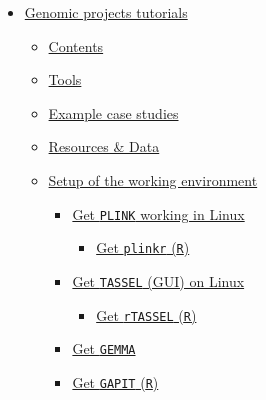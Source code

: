 \begin{itemize}
  \tightlist
  \item
        \protect\hyperlink{genomic-projects-tutorials}{Genomic projects
          tutorials}

        \begin{itemize}
          \tightlist
          \item
                \protect\hyperlink{contents}{Contents}
          \item
                \protect\hyperlink{tools}{Tools}
          \item
                \protect\hyperlink{example-case-studies}{Example case studies}
          \item
                \protect\hyperlink{resources--data}{Resources \& Data}
          \item
                \protect\hyperlink{setup-of-the-working-environment}{Setup of the
                  working environment}

                \begin{itemize}
                  \tightlist
                  \item
                        \protect\hyperlink{get-plink-working-in-linux}{Get \texttt{PLINK}
                          working in Linux}

                        \begin{itemize}
                          \tightlist
                          \item
                                \protect\hyperlink{get-plinkr-r}{Get \texttt{plinkr}
                                  (\texttt{R})}
                        \end{itemize}
                  \item
                        \protect\hyperlink{get-tassel-gui-on-linux}{Get \texttt{TASSEL}
                          (GUI) on Linux}

                        \begin{itemize}
                          \tightlist
                          \item
                                \protect\hyperlink{get-rtassel-r}{Get \texttt{rTASSEL}
                                  (\texttt{R})}
                        \end{itemize}
                  \item
                        \protect\hyperlink{get-gemma}{Get \texttt{GEMMA}}
                  \item
                        \protect\hyperlink{get-gapit-r}{Get \texttt{GAPIT} (\texttt{R})}
                \end{itemize}
        \end{itemize}
\end{itemize}

